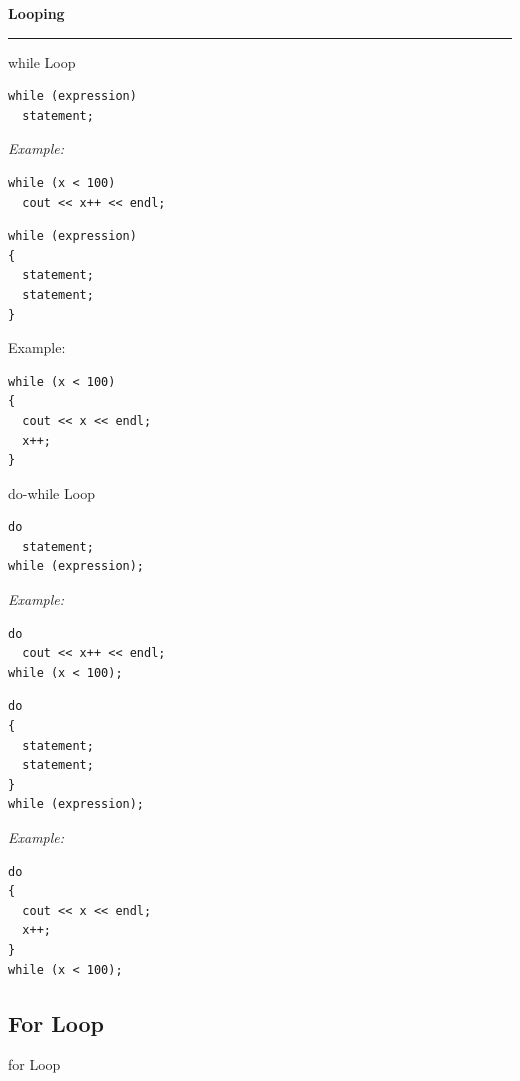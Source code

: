 \documentclass[final]{beamer}
\renewcommand{\section}[1]{%
  \par\vspace{1em}%
  {\noindent\usebeamerfont{section title}\Large\bfseries #1\par}%
  \vspace{0.5em}\hrule\vspace{1em}%
}
\begin{document}
\begin{frame}[t,fragile]
\begin{columns}[t,totalwidth=0.95\paperwidth, colsep=0.05\paperwidth]
\begin{column}{0.22\paperwidth}
\section{Looping}

\begin{block}{\raggedright while Loop}
\begin{lstlisting}
while (expression)
  statement;
\end{lstlisting}
{\it Example:}
\begin{lstlisting}
while (x < 100)
  cout << x++ << endl;
\end{lstlisting}
\begin{lstlisting}
while (expression)
{
  statement;
  statement;
}
\end{lstlisting}
Example:
\begin{lstlisting}
while (x < 100)
{
  cout << x << endl;
  x++;
}
\end{lstlisting}
\end{block}

\begin{block}{\raggedright do-while Loop}
\begin{lstlisting}
do
  statement;
while (expression);
\end{lstlisting}
{\it Example:}
\begin{lstlisting}
do
  cout << x++ << endl;
while (x < 100);
\end{lstlisting}
\begin{lstlisting}
do
{
  statement;
  statement;
}
while (expression);
\end{lstlisting}
{\it Example:}
\begin{lstlisting}
do
{
  cout << x << endl;
  x++;
}
while (x < 100);
\end{lstlisting}
\end{block}


\subsection{For Loop}
\begin{block}{\raggedright for Loop} 


\end{block}
\end{column}
\end{columns}
\end{frame}
\end{document}
